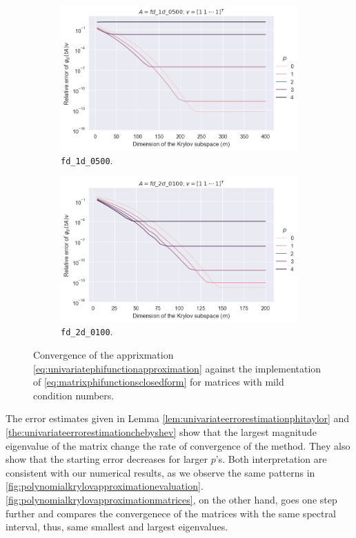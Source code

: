 \begin{figure}[h!]
    \centering
    \begin{subfigure}[b]{0.45\textwidth}
        \includegraphics[width=\textwidth]{img/krylovunivariate/fd_1d_0500_recursive.png}
        \caption{\texttt{fd\_1d\_0500}.}
    \end{subfigure}
    \hfill
    \begin{subfigure}[b]{0.45\textwidth}
        \includegraphics[width=\textwidth]{img/krylovunivariate/fd_2d_0100_recursive.png}
        \caption{\texttt{fd\_2d\_0100}.}
    \end{subfigure}
    \caption{Convergence of the apprixmation \eqref{eq:univariatephifunctionapproximation} against
    the implementation of \eqref{eq:matrixphifunctionsclosedform} for matrices with mild condition numbers.}
    \label{fig:polynomialkrylovapproximationevaluationrecursive}
\end{figure}

The error estimates given in Lemma \ref{lem:univariateerrorestimationphitaylor} and \autoref{the:univariateerrorestimationchebyshev}
show that the largest magnitude eigenvalue of the matrix change the rate of convergence of the method. They also show that the starting error
decreases for larger $p$'s. Both interpretation are consistent with our numerical results, as we observe the same patterns in
\autoref{fig:polynomialkrylovapproximationevaluation}. \autoref{fig:polynomialkrylovapproximationmatrices}, on the other hand, goes
one step further and compares the convergenece of the matrices with the same spectral interval, thus, same smallest and largest eigenvalues.

